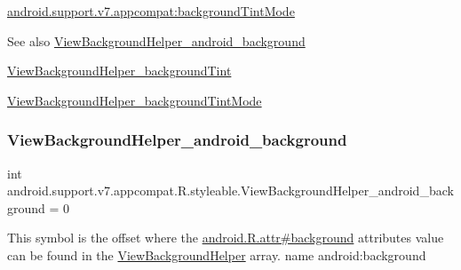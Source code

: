 {\ttfamily \hyperlink{classandroid_1_1support_1_1v7_1_1appcompat_1_1R_1_1styleable_ae71c6f8dbad2f486dc512dcaaada8083}{android.\+support.\+v7.\+appcompat\+:background\+Tint\+Mode}}

\begin{DoxySeeAlso}{See also}
\hyperlink{classandroid_1_1support_1_1v7_1_1appcompat_1_1R_1_1styleable_a0c4b9c84285d81c51eed6464d0775ffc}{View\+Background\+Helper\+\_\+android\+\_\+background} 

\hyperlink{classandroid_1_1support_1_1v7_1_1appcompat_1_1R_1_1styleable_a3508f617e0fdda797627149c05c527f3}{View\+Background\+Helper\+\_\+background\+Tint} 

\hyperlink{classandroid_1_1support_1_1v7_1_1appcompat_1_1R_1_1styleable_ae71c6f8dbad2f486dc512dcaaada8083}{View\+Background\+Helper\+\_\+background\+Tint\+Mode} 
\end{DoxySeeAlso}
\mbox{\label{classandroid_1_1support_1_1v7_1_1appcompat_1_1R_1_1styleable_a0c4b9c84285d81c51eed6464d0775ffc}} 
\subsubsection{\texorpdfstring{View\+Background\+Helper\+\_\+android\+\_\+background}{ViewBackgroundHelper\_android\_background}}
{\footnotesize\ttfamily int android.\+support.\+v7.\+appcompat.\+R.\+styleable.\+View\+Background\+Helper\+\_\+android\+\_\+background = 0\hspace{0.3cm}{\ttfamily [static]}}

This symbol is the offset where the \hyperlink{}{android.\+R.\+attr\#background} attribute\textquotesingle{}s value can be found in the \hyperlink{classandroid_1_1support_1_1v7_1_1appcompat_1_1R_1_1styleable_a41b23c720259f27b563271bda1b5767a}{View\+Background\+Helper} array.  name android\+:background \mbox{\label{classandroid_1_1support_1_1v7_1_1appcompat_1_1R_1_1styleable_a3508f617e0fdda797627149c05c527f3}} 
